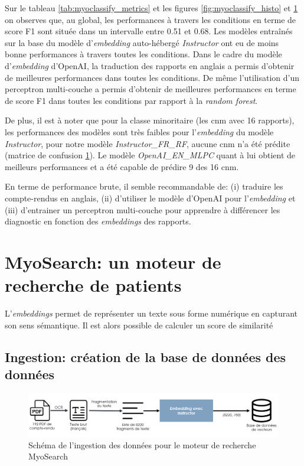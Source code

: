 Sur le tableau \ref{tab:myoclassify_metrics} et les figures \ref{fig:myoclassify_histo} et \ref{fig:myoclassify_conf} on observes que, au global, les performances à travers les conditions en terme de score F1 sont située dans un intervalle entre 0.51 et 0.68. Les modèles entraînés sur la base du modèle d'\textit{embedding} auto-hébergé \textit{Instructor} ont eu de moins bonne performances à travers toutes les conditions. Dans le cadre du modèle d'\textit{embedding} d'OpenAI, la traduction des rapports en anglais a permis d'obtenir de meilleures performances dans toutes les conditions. De même l'utilisation d'un perceptron multi-couche a permis d'obtenir de meilleures performances en terme de score F1 dans toutes les conditions par rapport à la \textit{random forest}.

De plus, il est à noter que pour la classe minoritaire (les \gls{cnm} avec 16 rapports), les performances des modèles sont très faibles pour l'\textit{embedding} du modèle \textit{Instructor}, pour notre modèle \textit{Instructor\_FR\_RF}, aucune \gls{cnm} n'a été prédite (matrice de confusion \ref{fig:myoclassify_conf}). Le modèle \textit{OpenAI\_EN\_MLPC} quant à lui obtient de meilleurs performances et a été capable de prédire 9 des 16 \gls{cnm}.  

En terme de performance brute, il semble recommandable de: (i) traduire les compte-rendus en anglais, (ii) d'utiliser le modèle d'OpenAI pour l'\textit{embedding} et (iii) d'entrainer un perceptron multi-couche pour apprendre à différencer les diagnostic en fonction des \textit{embeddings} des rapports. 

\section{MyoSearch: un moteur de recherche de patients}
L'\textit{embeddings} permet de représenter un texte sous forme numérique en capturant son sens sémantique. Il est alors possible de calculer un score de similarité 
\subsection{Ingestion: création de la base de données des données}
\begin{figure}[htbp]
  \centering
  \includegraphics[width=1\textwidth]{figures/myosearch_ingest.png}
  \caption[Ingestion des données dans MyoSearch]{Schéma de l'ingestion des données pour le moteur de recherche MyoSearch}
  \label{fig:myoclassify_conf}
\end{figure}
